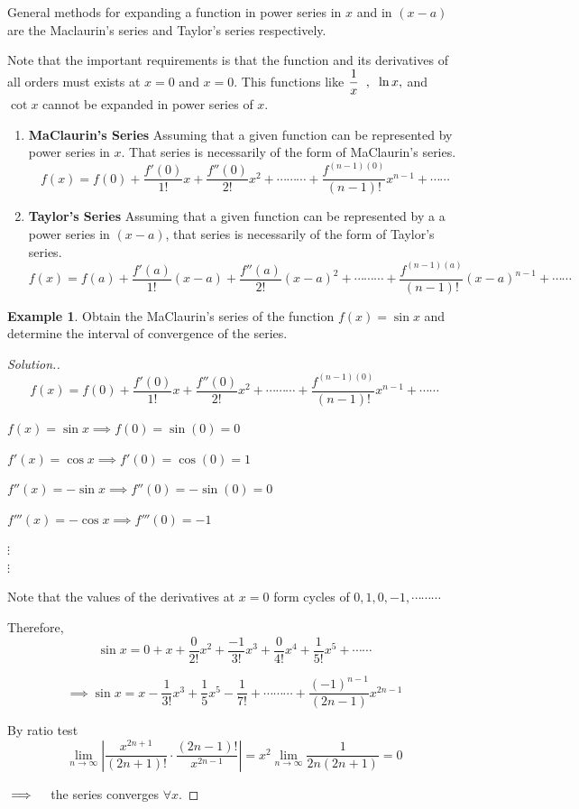 \documentclass[11pt,a4paper]{article}
\theoremstyle{definition}
\newtheorem{exa}[thm]{Example}
\newenvironment{solution}
  {\renewcommand{\qedsymbol}{}\begin{proof}[\textit{Solution}.]}
  {\end{proof}}
\begin{document}
General methods for expanding a function in power series in $x$ and in $(x - a)$ are the Maclaurin's series and Taylor's series respectively.


Note that the important requirements is that the function and its derivatives of all orders must exists at $x = 0$ and $x = 0$. This functions like $\dfrac{1}{x}\hspace{0.2cm}, \hspace{0.2cm} \ln x, $ and $\cot x$ cannot be expanded in power series of $x$.


\begin{enumerate}
\item \textbf{MaClaurin's Series}
Assuming that a given function can be represented by power series in $x$. That series is necessarily of the form of MaClaurin's series. 
$$f(x) = f(0) + \frac{f'(0)}{1!}x + \frac{f''(0)}{2!}x^2 + \cdots\cdots\cdots + \frac{f^{(n-1)(0)}}{(n-1)!}x^{n-1} + \cdots\cdots$$

\item \textbf{Taylor's Series}
Assuming that a given function can be represented by a a power series  in $(x -a)$, that series is necessarily of the form of Taylor's series.
$$f(x) = f(a) + \frac{f'(a)}{1!}(x-a) + \frac{f''(a)}{2!}(x-a)^2 + \cdots\cdots\cdots + \frac{f^{(n-1)(a)}}{(n-1)!}(x-a)^{n-1} + \cdots\cdots$$
\end{enumerate}

\begin{exa}


Obtain the MaClaurin's series of the function $f(x) = \sin x$ and determine the interval of convergence of the series.
\end{exa}


\begin{solution}
$$f(x) = f(0) + \frac{f'(0)}{1!}x + \frac{f''(0)}{2!}x^2 + \cdots\cdots\cdots + \frac{f^{(n-1)(0)}}{(n-1)!}x^{n-1} + \cdots\cdots$$

$f(x) = \sin x \implies f(0) = \sin (0) = 0$


$f'(x) = \cos x \implies f'(0) = \cos (0) = 1$


$f''(x) = -\sin x \implies f''(0) = -\sin (0) = 0$


$f'''(x) = -\cos x \implies f'''(0)= -1$


$\vdots$\\$\vdots$


Note that the values of the derivatives at $x = 0$ form cycles of $0, 1 , 0 , -1, \cdots\cdots\cdots$


Therefore,
$$\sin x = 0 + x + \frac{0}{2!}x^2 + \frac{-1}{3!}x^3 + \frac{0}{4!}x^4 + \frac{1}{5!}x^5+\cdots\cdots$$

$$\implies \sin x = x - \frac{1}{3!}x^3 + \frac{1}{5}x^5 - \frac{1}{7!} + \cdots\cdots\cdots + \frac{(-1)^{n-1}}{(2n -1)}x^{2n-1}$$

By ratio test
$$\lim\limits_{n \rightarrow \infty} \left|\dfrac{x^{2n + 1}}{(2n+1)!}\cdot \dfrac{(2n-1)!}{x^{2n-1}}\right|= x^2\lim\limits_{n\rightarrow \infty} \frac{1}{2n(2n+1)} = 0$$

$\implies\hspace{0.3cm}$ the series converges $\forall x$.
\end{solution}
\end{document}
